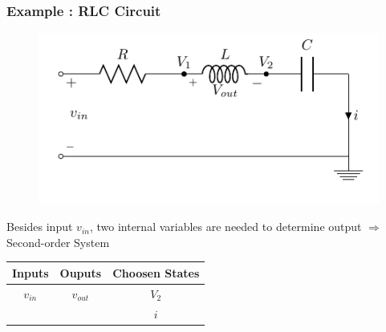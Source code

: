 \begin{frame}
	\frametitle{Example : RLC Circuit}
	
		\begin{figure}
		\centering
		\includegraphics[width=0.7\linewidth]{img/circuit-RLC}
		\label{fig:circuit-RLC}
		\end{figure}
		Besides input $v_{in}$, two internal variables are needed to determine output $\Rightarrow$ Second-order System
		\begin{center}
			\begin{tabular}{c@{\hskip 1cm} c@{\hskip 1cm} c}
				Inputs 	& Ouputs 	& Choosen States \\ \hline
				$v_{in}$ 	& $v_{out}$	& $V_2$ \\
				& & $i$ \\ 
			\end{tabular}
		\end{center}
		
\end{frame}

